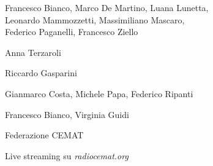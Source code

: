 \medskip

\textbf{}

Francesco Bianco, Marco De Martino, Luana Lunetta, \\ Leonardo Mammozzetti,  Massimiliano Mascaro, \\ Federico Paganelli, Francesco Ziello

\medskip

\textbf{}

Anna Terzaroli

\medskip

\textbf{}

Riccardo Gasparini



\textbf{}

Gianmarco Costa, Michele Papa, Federico Ripanti

\medskip

\textbf{}

Francesco Bianco, Virginia Guidi

\vfill

\textbf{}

Federazione CEMAT

Live streaming su \emph{radiocemat.org}